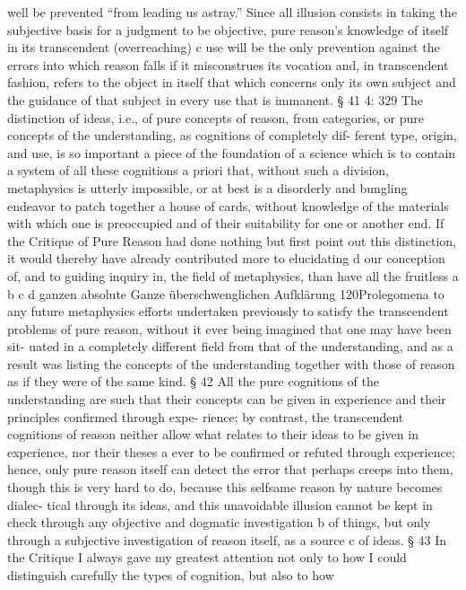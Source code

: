 well be prevented “from leading us astray.”
Since all illusion consists in taking the subjective basis for a judgment
to be objective, pure reason’s knowledge of itself in its transcendent
(overreaching) c use will be the only prevention against the errors into
which reason falls if it misconstrues its vocation and, in transcendent
fashion, refers to the object in itself that which concerns only its own
subject and the guidance of that subject in every use that is immanent.
§ 41
4: 329
The distinction of ideas, i.e., of pure concepts of reason, from categories,
or pure concepts of the understanding, as cognitions of completely dif-
ferent type, origin, and use, is so important a piece of the foundation of
a science which is to contain a system of all these cognitions a priori that,
without such a division, metaphysics is utterly impossible, or at best is
a disorderly and bungling endeavor to patch together a house of cards,
without knowledge of the materials with which one is preoccupied and
of their suitability for one or another end. If the Critique of Pure Reason
had done nothing but ﬁrst point out this distinction, it would thereby
have already contributed more to elucidating d our conception of, and to
guiding inquiry in, the ﬁeld of metaphysics, than have all the fruitless
a
b
c
d
ganzen
absolute Ganze
überschwenglichen
Aufklärung
120Prolegomena to any future metaphysics
efforts undertaken previously to satisfy the transcendent problems of
pure reason, without it ever being imagined that one may have been sit-
uated in a completely different ﬁeld from that of the understanding, and
as a result was listing the concepts of the understanding together with
those of reason as if they were of the same kind.
§ 42
All the pure cognitions of the understanding are such that their concepts
can be given in experience and their principles conﬁrmed through expe-
rience; by contrast, the transcendent cognitions of reason neither allow
what relates to their ideas to be given in experience, nor their theses a ever
to be conﬁrmed or refuted through experience; hence, only pure reason
itself can detect the error that perhaps creeps into them, though this is
very hard to do, because this selfsame reason by nature becomes dialec-
tical through its ideas, and this unavoidable illusion cannot be kept in
check through any objective and dogmatic investigation b of things, but
only through a subjective investigation of reason itself, as a source c of
ideas.
§ 43
In the Critique I always gave my greatest attention not only to how I
could distinguish carefully the types of cognition, but also to how
